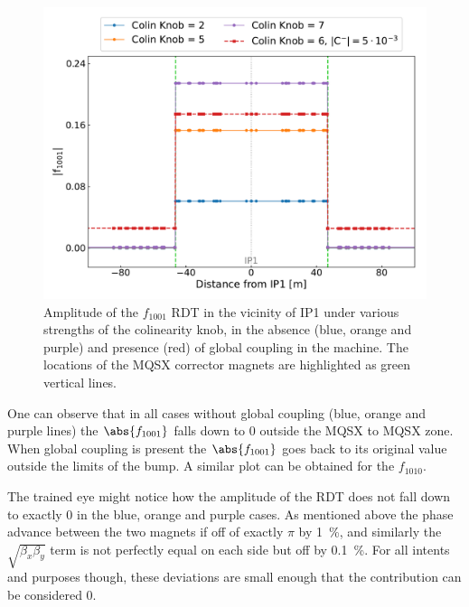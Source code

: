 \begin{figure}[!htb]
    \centering
    \includegraphics*[width=\textwidth]{Figures/IR_Coupling_Correction/colinearity_knob_effect.pdf}
    \caption{Amplitude of the \(f_{1001}\) RDT in the vicinity of IP\num{1} under various strengths of the colinearity knob, in the absence (\textcolor{mplblue}{blue}, \textcolor{mplorange}{orange} and \textcolor{mplpurple}{purple}) and presence (\textcolor{mplred}{red}) of global coupling in the machine. The locations of the MQSX corrector magnets are highlighted as \textcolor{mqsx_green}{green} vertical lines.}
    \label{figure:colinearity_knob_effect}
\end{figure}

One can observe that in all cases without global coupling (\textcolor{mplblue}{blue}, \textcolor{mplorange}{orange} and \textcolor{mplpurple}{purple} lines) the \(\abs{f_{1001}}\) falls down to \num{0} outside the MQSX to MQSX zone.
When global coupling is present the \(\abs{f_{1001}}\) goes back to its original value outside the limits of the bump.
A similar plot can be obtained for the \(f_{1010}\).

The trained eye might notice how the amplitude of the RDT does not fall down to exactly \num{0} in the \textcolor{mplblue}{blue}, \textcolor{mplorange}{orange} and \textcolor{mplpurple}{purple} cases.
As mentioned above the phase advance between the two magnets if off of exactly \(\pi\) by \qty{1}{\percent}, and similarly the \(\sqrt{\beta_x \beta_y}\) term is not perfectly equal on each side but off by \qty{0.1}{\percent}.
For all intents and purposes though, these deviations are small enough that the contribution can be considered \num{0}.
\newline


